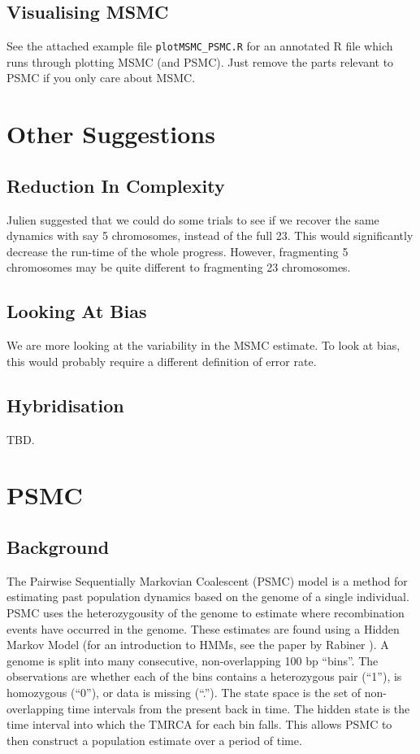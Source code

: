 \documentclass[11pt,a4paper]{article}
\begin{document}
\subsection{Visualising MSMC}
See the attached example file \texttt{plotMSMC\_PSMC.R} for an annotated R file which runs through plotting MSMC (and PSMC). Just remove the parts relevant to PSMC if you only care about MSMC.


\section{Other Suggestions}
\subsection{Reduction In Complexity}
Julien suggested that we could do some trials to see if we recover the same dynamics with say 5 chromosomes, instead of the full 23. This would significantly decrease the run-time of the whole progress. However, fragmenting 5 chromosomes may be quite different to fragmenting 23 chromosomes.

\subsection{Looking At Bias}
We are more looking at the variability in the MSMC estimate. To look at bias, this would probably require a different definition of error rate.

\subsection{Hybridisation}
TBD.

\section{PSMC}
\subsection{Background}
The Pairwise Sequentially Markovian Coalescent (PSMC) model \cite{li2011inference} is a method for estimating past population dynamics based on the  genome of a single individual. PSMC uses the heterozygousity of the genome to estimate where recombination events have occurred in the genome. These estimates are found using a Hidden Markov Model (for an introduction to HMMs, see the paper by Rabiner \cite{rabiner1989tutorial}). A genome is split into many consecutive, non-overlapping 100 bp ``bins''. The observations are whether each of the bins contains a heterozygous pair (``1''), is homozygous (``0''), or data is missing (``.''). The state space is the set of non-overlapping time intervals from the present back in time. The hidden state is the time interval into which the TMRCA for each bin falls. This allows PSMC to then construct a population estimate over a period of time. 
\end{document}
